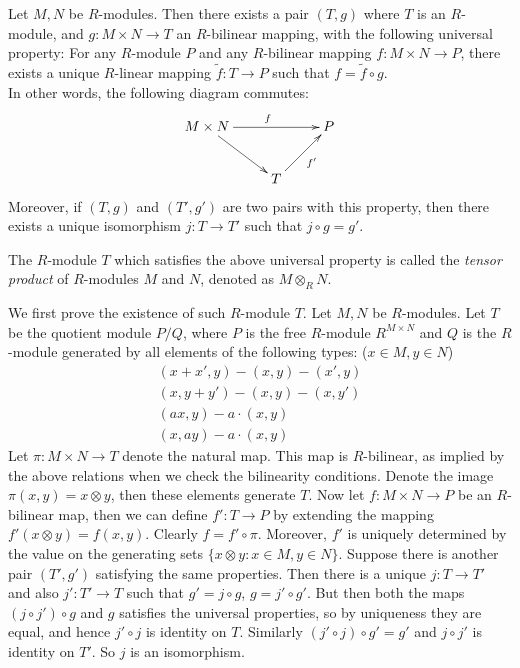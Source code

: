\begin{lemma}
\label{lemma-tensor-product}
Let $M, N$ be $R$-modules. Then there exists a pair $(T, g)$
where $T$ is an $R$-module, and
$g : M\times N \rightarrow T$ an $R$-bilinear
mapping, with the following universal property:
For any $R$-module $P$ and any $R$-bilinear mapping
$f : M\times N \rightarrow P$, there
exists a unique $R$-linear
mapping $\tilde{f} : T\rightarrow
P$ such that $f = \tilde{f} \circ g$. \\
In other words, the following diagram commutes:
$$
\xymatrix{
M\times N \ar[rr]^{f} \ar[dr] & &P\\
&T \ar[ur]_{f'}
}
$$
Moreover, if $(T, g)$ and $(T', g')$
are two pairs with this property, then there
exists a unique isomorphism
$j : T\rightarrow T'$ such that $j\circ g = g'$.
\end{lemma}

\noindent
The $R$-module $T$ which satisfies the above universal property is called
the  \textit{tensor product} of $R$-modules $M$ and $N$, denoted as
$M\otimes_{R} N$.

\medskip\noindent
We first prove the existence of such $R$-module $T$.
Let $M, N$ be $R$-modules.
Let $T$ be the quotient module
$P/Q$, where $P$ is the free $R$-module $R^{M\times N}$ and $Q$ is the
$R$-module generated by all elements of
the following types: ($x\in M, y\in N$)
\begin{align}
(x + x', y)-(x, y)-(x', y)\\
(x, y + y')-(x, y)-(x, y')\\
(ax, y)-a\cdot(x, y)\\
(x, ay)-a\cdot(x, y)
\end{align}
Let $\pi : M\times N\rightarrow T$ denote the natural map.
This map is $R$-bilinear, as
implied by the above relations
when we check the bilinearity conditions. Denote the image
$\pi(x, y) = x\otimes
y$, then these elements generate
$T$. Now let $f : M\times N\rightarrow P$ be an $R$-bilinear map,
then we can define
$f' : T\rightarrow P$ by extending the mapping
$f'(x\otimes y) = f(x, y)$. Clearly $f = f'\circ \pi$. Moreover, $f'$ is
uniquely determined by the value on the
generating sets $\{x\otimes y : x\in M, y\in N\}$.
Suppose there is another pair $(T', g')$ satisfying the same properties.
Then there is a unique $j : T\rightarrow T'$ and
also $j' : T'\rightarrow T$ such that $g' = j\circ g$, $g = j'\circ g'$.
But then both the maps $(j\circ j') \circ g$ and $g$
satisfies the universal properties, so by uniqueness they are equal,
and hence $j'\circ j$ is identity on $T$.
Similarly $(j'\circ j) \circ g' = g'$ and $j\circ j'$ is identity on $T'$.
So $j$ is an isomorphism.

